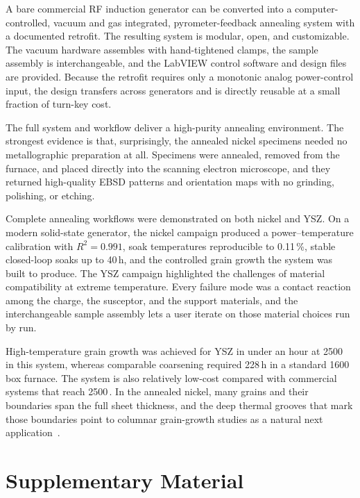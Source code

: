 \documentclass[%
 aip,
 rsi,%
 amsmath,amssymb,
 reprint,%
]{revtex4-2}
\begin{document}
A bare commercial RF induction generator can be converted into a
computer-controlled, vacuum and gas integrated, pyrometer-feedback annealing system
with a documented retrofit. The resulting system is modular, open, and
customizable. The vacuum hardware assembles with hand-tightened clamps, the
sample assembly is interchangeable, and the LabVIEW control software and
design files are provided. Because the retrofit requires only a monotonic
analog power-control input, the design transfers across generators and is
directly reusable at a small fraction of turn-key cost.

The full system and workflow deliver a high-purity annealing environment.
The strongest evidence is that, surprisingly, the annealed nickel specimens needed no
metallographic preparation at all. Specimens were annealed, removed from
the furnace, and placed directly into the scanning electron microscope,
and they returned
high-quality EBSD patterns and orientation maps with no grinding,
polishing, or etching.

Complete annealing workflows were demonstrated on both nickel and YSZ. On
a modern solid-state generator, the nickel campaign produced a
power--temperature calibration with $R^2 = 0.991$, soak temperatures
reproducible to 0.11\,\%, stable closed-loop soaks up to 40\,h, and the
controlled grain growth the system was built to produce. The YSZ campaign
highlighted the challenges of material compatibility at extreme
temperature. Every failure mode was a contact reaction among the charge,
the susceptor, and the support materials, and the interchangeable sample
assembly lets a user iterate on those material choices run by run.

High-temperature grain growth was achieved for YSZ in under an hour at
2500\,\celsius{} in this system, whereas comparable coarsening required
228\,h in a standard 1600\,\celsius{} box furnace. The system is also
relatively low-cost compared with commercial systems that reach
2500\,\celsius. In the annealed nickel, many grains and their boundaries span
the full sheet thickness, and the deep thermal grooves that mark those
boundaries point to columnar grain-growth studies as a natural next
application~\cite{zhang2007dynamicsandmechanism}.

\section*{Supplementary Material}
\end{document}
